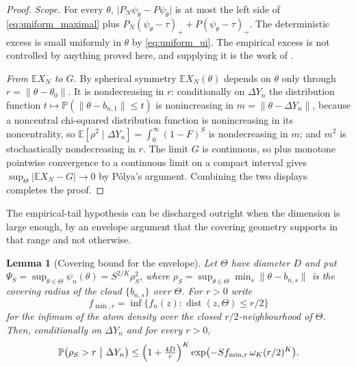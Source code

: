 \documentclass[11pt]{article}
\newtheorem{lemma}[lemma]{Lemma}
\theoremstyle{definition}
\newcommand{\E}{\mathbb{E}}
\newcommand{\Pp}{\mathbb{P}}
\newcommand{\thetao}{\theta_0}
\begin{document}
\begin{proof}
\emph{Scope.} For every $\theta$, $\lvert P_N\psi_\theta-P\psi_\theta\rvert$ is at most the left side of \eqref{eq:uniform_maximal} plus $P_N(\psi_\theta-\tau)_++P(\psi_\theta-\tau)_+$. The deterministic excess is small uniformly in $\theta$ by \eqref{eq:uniform_ui}. The empirical excess is not controlled by anything proved here, and supplying it is the work of .

\emph{From $\E X_N$ to $G$.} By spherical symmetry $\E X_N(\theta)$ depends on $\theta$ only through $r=\lVert\theta-\thetao\rVert$. It is nondecreasing in $r$: conditionally on $\Delta Y_n$ the distribution function $t\mapsto\Pp(\lVert\theta-b_{n,1}\rVert\le t)$ is nonincreasing in $m=\lVert\theta-\Delta Y_n\rVert$, because a noncentral chi-squared distribution function is nonincreasing in its noncentrality, so $\E[\rho^2\mid\Delta Y_n]=\int_0^\infty(1-F)^S$ is nondecreasing in $m$; and $m^2$ is stochastically nondecreasing in $r$. The limit $G$ is continuous, so  plus monotone pointwise convergence to a continuous limit on a compact interval gives $\sup_\Theta\lvert\E X_N-G\rvert\to0$ by P\'olya's argument. Combining the two displays completes the proof.
\end{proof}

The empirical-tail hypothesis can be discharged outright when the dimension is large enough, by an envelope argument that the covering geometry supports in that range and not otherwise.

\begin{lemma}[Covering bound for the envelope]\label{lem:covering}
Let $\Theta$ have diameter $D$ and put $\Psi_S=\sup_{\theta\in\Theta}\psi_n(\theta)=S^{2/K}\rho_S^2$, where $\rho_S=\sup_{\theta\in\Theta}\min_s\lVert\theta-b_{n,s}\rVert$ is the covering radius of the cloud $\{b_{n,s}\}$ over $\Theta$. For $r>0$ write
\begin{equation}\label{eq:covering_fmin}
f_{\min,r}=\inf\bigl\{f_n(z):\operatorname{dist}(z,\Theta)\le r/2\bigr\}
\end{equation}
for the infimum of the atom density over the closed $r/2$-neighbourhood of $\Theta$. Then, conditionally on $\Delta Y_n$ and for every $r>0$,
\begin{equation}\label{eq:covering_tail}
\Pp\bigl(\rho_S>r\ \big|\ \Delta Y_n\bigr)
\le\Bigl(1+\tfrac{4D}{r}\Bigr)^{K}\exp\bigl(-S f_{\min,r}\,\omega_K(r/2)^K\bigr).
\end{equation}
\end{lemma}
\end{document}
